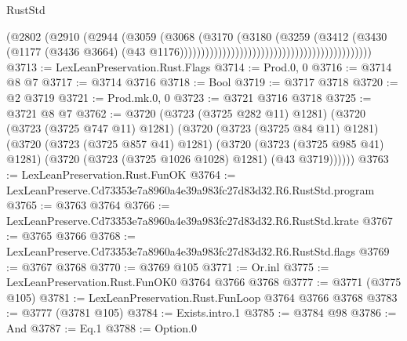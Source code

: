 \begin{lexlean}{RustStd}
\begin{coremodule}
                                                                      (@2802
                                                                        (@2910
                                                                          (@2944
                                                                            (@3059
                                                                              (@3068
                                                                                (@3170
                                                                                  (@3180
                                                                                    (@3259
                                                                                      (@3412
                                                                                        (@3430
                                                                                          (@1177
                                                                                            (@3436
                                                                                              @3664)
                                                                                            (@43
                                                                                              @1176)))))))))))))))))))))))))))))))))))))))))))))
@3713 := LexLeanPreservation.Rust.Flags
@3714 := Prod.{0, 0}
@3716 := @3714 @8 @7
@3717 := @3714 @3716
@3718 := Bool
@3719 := @3717 @3718
@3720 := @2 @3719
@3721 := Prod.mk.{0, 0}
@3723 := @3721 @3716 @3718
@3725 := @3721 @8 @7
@3762 := @3720
    (@3723 (@3725 @282 @11) @1281)
    (@3720
      (@3723 (@3725 @747 @11) @1281)
      (@3720
        (@3723 (@3725 @84 @11) @1281)
        (@3720
          (@3723 (@3725 @857 @41) @1281)
          (@3720
            (@3723 (@3725 @985 @41) @1281)
            (@3720 (@3723 (@3725 @1026 @1028) @1281) (@43 @3719))))))
@3763 := LexLeanPreservation.Rust.FunOK
@3764 := LexLeanPreserve.Cd73353e7a8960a4e39a983fc27d83d32.R6.RustStd.program
@3765 := @3763 @3764
@3766 := LexLeanPreserve.Cd73353e7a8960a4e39a983fc27d83d32.R6.RustStd.krate
@3767 := @3765 @3766
@3768 := LexLeanPreserve.Cd73353e7a8960a4e39a983fc27d83d32.R6.RustStd.flags
@3769 := @3767 @3768
@3770 := @3769 @105
@3771 := Or.inl
@3775 := LexLeanPreservation.Rust.FunOK0 @3764 @3766 @3768
@3777 := @3771 (@3775 @105)
@3781 := LexLeanPreservation.Rust.FunLoop @3764 @3766 @3768
@3783 := @3777 (@3781 @105)
@3784 := Exists.intro.{1}
@3785 := @3784 @98
@3786 := And
@3787 := Eq.{1}
@3788 := Option.{0}

\end{coremodule}
\end{lexlean}
